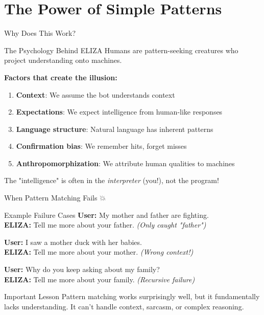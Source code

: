 \documentclass[aspectratio=169]{beamer}
\begin{document}
\section{The Power of Simple Patterns}

\begin{frame}{Why Does This Work? 🤔}
\small
\begin{block}{The Psychology Behind ELIZA}
Humans are pattern-seeking creatures who project understanding onto machines.
\end{block}

\vspace{0.3cm}

\textbf{Factors that create the illusion:}
\begin{enumerate}\setlength{\itemsep}{0pt}
    \item \textbf{Context}: We assume the bot understands context
    \item \textbf{Expectations}: We expect intelligence from human-like responses
    \item \textbf{Language structure}: Natural language has inherent patterns
    \item \textbf{Confirmation bias}: We remember hits, forget misses
    \item \textbf{Anthropomorphization}: We attribute human qualities to machines
\end{enumerate}

\vspace{0.3cm}

\begin{thinkaboutit}
The "intelligence" is often in the \textit{interpreter} (you!), not the program!
\end{thinkaboutit}
\end{frame}

\begin{frame}{When Pattern Matching Fails 💥}
\begin{block}{Example Failure Cases}
\textbf{User:} My mother and father are fighting.\\
\textbf{ELIZA:} Tell me more about your father. \textit{(Only caught "father")}

\vspace{0.2cm}

\textbf{User:} I saw a mother duck with her babies.\\
\textbf{ELIZA:} Tell me more about your mother. \textit{(Wrong context!)}

\vspace{0.2cm}

\textbf{User:} Why do you keep asking about my family?\\
\textbf{ELIZA:} Tell me more about your family. \textit{(Recursive failure)}
\end{block}

\vspace{0.3cm}

\begin{alertblock}{Important Lesson}
Pattern matching works surprisingly well, but it fundamentally lacks understanding. It can't handle context, sarcasm, or complex reasoning.
\end{alertblock}
\end{frame}
\end{document}
